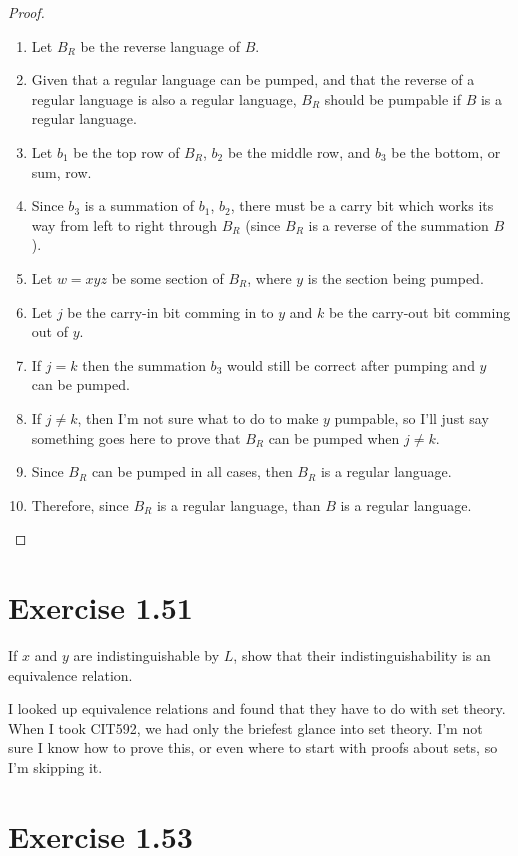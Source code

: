\documentclass{article}
\begin{document}
\begin{proof}
	\mbox{}
	\begin{enumerate}
	  \item Let $B_R$ be the reverse language of $B$.
	  \item Given that a regular language can be pumped, and that the reverse of a
	  regular language is also a regular language, $B_R$ should be pumpable if $B$
	  is a regular language.
	  \item Let $b_1$ be the top row of $B_R$, $b_2$ be the middle row, and $b_3$
	  be the bottom, or sum, row. 
	  \item Since $b_3$ is a summation of $b_1$, $b_2$, there must be a carry bit
	  which works its way from left to right through $B_R$ (since $B_R$ is a
	  reverse of the summation $B$).
	  \item Let $w = xyz$ be some section of $B_R$, where $y$ is the section being
	  pumped.
	  \item Let $j$ be the carry-in bit comming in to $y$ and $k$ be the carry-out
	  bit comming out of $y$.
	  \item If $j = k$ then the summation $b_3$ would still be correct after
	  pumping and $y$ can be pumped.
	  \item If $j \ne k$, then I'm not sure what to do to make $y$ pumpable, so
	  I'll just say something goes here to prove that $B_R$ can be pumped when $j \ne
	  k$.
	  \item Since $B_R$ can be pumped in all cases, then $B_R$ is a regular
	  language.
	  \item Therefore, since $B_R$ is a regular language, than $B$ is a regular
	  language. \qedhere
	\end{enumerate}
\end{proof}

\section{Exercise 1.51}

If $x$ and $y$ are indistinguishable by $L$, show that their
indistinguishability is an equivalence relation.

I looked up equivalence relations and found that they have to do with set
theory. When I took CIT592, we had only the briefest glance into set theory. I'm not
sure I know how to prove this, or even where to start with proofs about sets, so
I'm skipping it.

\section{Exercise 1.53}
\end{document}
